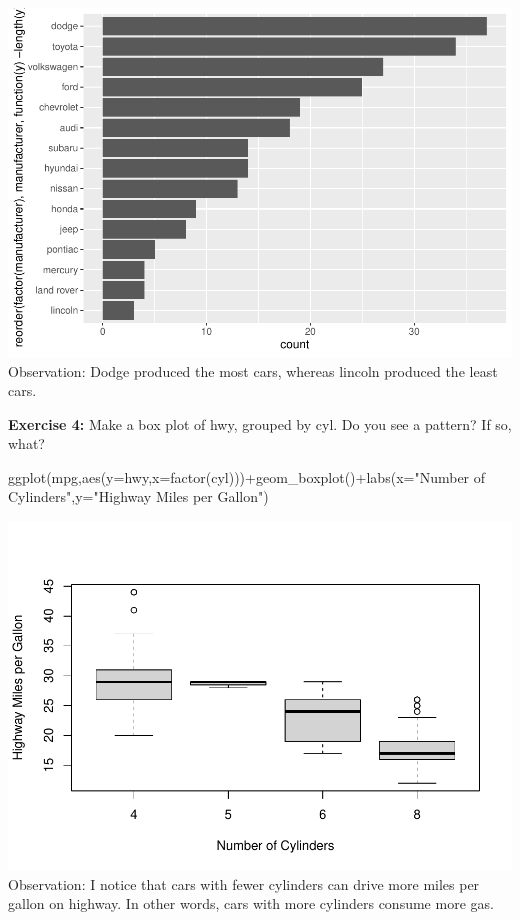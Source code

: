 \documentclass[
]{article}
\newenvironment{Shaded}{\begin{snugshade}}{\end{snugshade}}
\newcommand{\AttributeTok}[1]{\textcolor[rgb]{0.77,0.63,0.00}{#1}}
\newcommand{\FunctionTok}[1]{\textcolor[rgb]{0.00,0.00,0.00}{#1}}
\newcommand{\NormalTok}[1]{#1}
\newcommand{\SpecialCharTok}[1]{\textcolor[rgb]{0.00,0.00,0.00}{#1}}
\newcommand{\StringTok}[1]{\textcolor[rgb]{0.31,0.60,0.02}{#1}}
\begin{document}
\includegraphics{PSTAT131-HW1_files/figure-latex/unnamed-chunk-3-1.pdf}
Observation: Dodge produced the most cars, whereas lincoln produced the
least cars.

\textbf{Exercise 4:} Make a box plot of hwy, grouped by cyl. Do you see
a pattern? If so, what?

\begin{Shaded}
\begin{Highlighting}[]
\FunctionTok{ggplot}\NormalTok{(mpg,}\FunctionTok{aes}\NormalTok{(}\AttributeTok{y=}\NormalTok{hwy,}\AttributeTok{x=}\FunctionTok{factor}\NormalTok{(cyl)))}\SpecialCharTok{+}\FunctionTok{geom\_boxplot}\NormalTok{()}\SpecialCharTok{+}\FunctionTok{labs}\NormalTok{(}\AttributeTok{x=}\StringTok{"Number of Cylinders"}\NormalTok{,}\AttributeTok{y=}\StringTok{"Highway Miles per Gallon"}\NormalTok{)}
\end{Highlighting}
\end{Shaded}

\includegraphics{PSTAT131-HW1_files/figure-latex/unnamed-chunk-4-1.pdf}
Observation: I notice that cars with fewer cylinders can drive more
miles per gallon on highway. In other words, cars with more cylinders
consume more gas.
\end{document}
